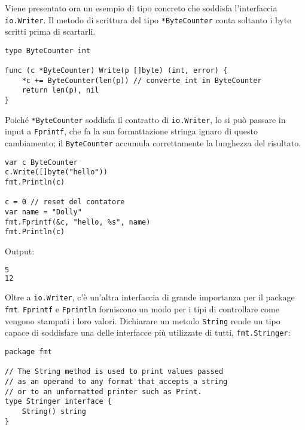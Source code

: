 \documentclass[../../thesis.tex]{subfiles}
\begin{document}
    Viene presentato ora un esempio di tipo concreto che soddisfa l'interfaccia \verb"io.Writer".
    Il metodo di scrittura del tipo \verb"*ByteCounter" conta soltanto i byte scritti prima di scartarli.
    \begin{lstlisting}[frame = single, label = {lst:lstlisting6-1.3}]
type ByteCounter int

func (c *ByteCounter) Write(p []byte) (int, error) {
    *c += ByteCounter(len(p)) // converte int in ByteCounter
    return len(p), nil
}
    \end{lstlisting}
    Poiché \verb"*ByteCounter" soddisfa il contratto di \verb"io.Writer", lo si può passare in input a \verb"Fprintf", che fa la sua formattazione stringa ignaro di questo cambiamento;
    il \verb"ByteCounter" accumula correttamente la lunghezza del risultato.
    \begin{lstlisting}[frame = single, label = {lst:lstlisting6-1.4}]
var c ByteCounter
c.Write([]byte("hello"))
fmt.Println(c)

c = 0 // reset del contatore
var name = "Dolly"
fmt.Fprintf(&c, "hello, %s", name)
fmt.Println(c)
    \end{lstlisting}
    Output:
    \begin{lstlisting}[language = bash, frame = L, label = {lst:lstlisting6-1.5}]
5
12
    \end{lstlisting}
    Oltre a \verb"io.Writer", c'è un'altra interfaccia di grande importanza per il package \verb"fmt". \verb"Fprintf" e \verb"Fprintln" forniscono un modo per i tipi di controllare come vengono stampati i loro valori.
    Dichiarare un metodo \verb"String" rende un tipo capace di soddisfare una delle interfacce più utilizzate di tutti, \verb"fmt.Stringer":
    \begin{lstlisting}[frame = single, label = {lst:lstlisting6-1.6}]
package fmt

// The String method is used to print values passed
// as an operand to any format that accepts a string
// or to an unformatted printer such as Print.
type Stringer interface {
    String() string
}
    \end{lstlisting}
\end{document}
